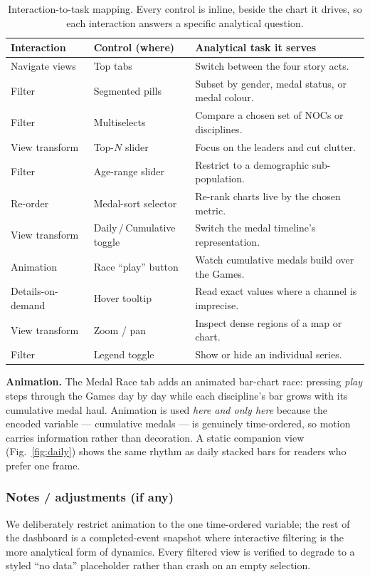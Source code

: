 \documentclass[11pt]{article}
\newcommand{\notesadj}{\subsubsection*{\color{coral}Notes / adjustments (if any)}}
\begin{document}
\begin{table}[htbp]
\centering\small\sffamily
\renewcommand{\arraystretch}{1.2}
\begin{tabularx}{\linewidth}{l l X}
\toprule
\rowcolor{charcoal}\textbf{\color{white}Interaction} & \textbf{\color{white}Control (where)} & \textbf{\color{white}Analytical task it serves} \\
\midrule
Navigate views   & Top tabs               & Switch between the four story acts. \\
Filter           & Segmented pills        & Subset by gender, medal status, or medal colour. \\
Filter           & Multiselects           & Compare a chosen set of NOCs or disciplines. \\
View transform   & Top-$N$ slider         & Focus on the leaders and cut clutter. \\
Filter           & Age-range slider       & Restrict to a demographic sub-population. \\
Re-order         & Medal-sort selector    & Re-rank charts live by the chosen metric. \\
View transform   & Daily\,/\,Cumulative toggle & Switch the medal timeline's representation. \\
Animation        & Race ``play'' button   & Watch cumulative medals build over the Games. \\
Details-on-demand& Hover tooltip          & Read exact values where a channel is imprecise. \\
View transform   & Zoom / pan             & Inspect dense regions of a map or chart. \\
Filter           & Legend toggle          & Show or hide an individual series. \\
\bottomrule
\end{tabularx}
\caption{Interaction-to-task mapping. Every control is inline, beside the chart it
drives, so each interaction answers a specific analytical question.}
\label{tab:interaction}
\end{table}

\textbf{Animation.} The Medal Race tab adds an animated bar-chart race:
pressing \emph{play} steps through the Games day by day while each discipline's
bar grows with its cumulative medal haul. Animation is used \emph{here and only
here} because the encoded variable --- cumulative medals --- is genuinely
time-ordered, so motion carries information rather than decoration. A static
companion view (Fig.~\ref{fig:daily}) shows the same rhythm as daily stacked bars
for readers who prefer one frame.
\notesadj
We deliberately restrict animation to the one time-ordered variable; the rest of
the dashboard is a completed-event snapshot where interactive filtering is the
more analytical form of dynamics. Every filtered view is verified to degrade to a
styled ``no data'' placeholder rather
than crash on an empty selection.
\end{document}
